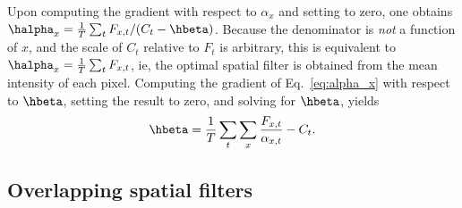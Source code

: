 Upon computing the gradient with respect to $\alpha_x$ and setting to zero, one obtains $\halpha_x=\frac{1}{T} \sum_t F_{x,t}/(C_t-\hbeta)$.  Because the denominator is \emph{not} a function of $x$, and the scale of $C_t$ relative to $F_t$ is arbitrary, this is equivalent to $\halpha_x=\frac{1}{T} \sum_t F_{x,t}$, ie, the optimal spatial filter is obtained from the mean intensity of each pixel.  Computing the gradient of Eq.~\eqref{eq:alpha_x} with respect to $\hbeta$, setting the result to zero, and solving for $\hbeta$, yields
\begin{align} \label{eq:beta}
	\hbeta = \frac{1}{T} \sum_t \sum_x \frac{F_{x,t}}{\alpha_{x,t}} - C_t.
\end{align} 




\subsection{Overlapping spatial filters} \label{sec:methods:overlapping}

